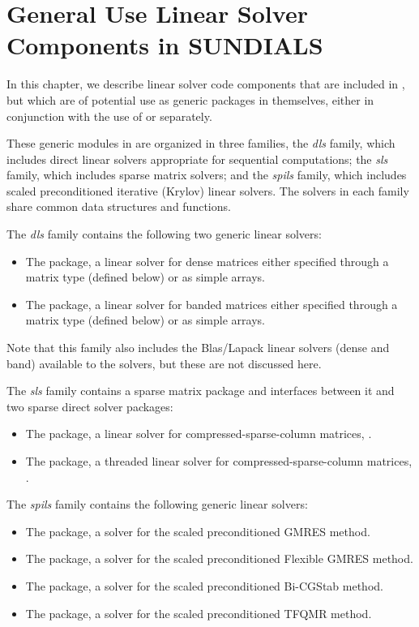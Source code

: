 \chapter{General Use Linear Solver Components in SUNDIALS}\label{s:gen_linsolv}

In this chapter, we describe linear solver code components that are included in
{\sundials}, but which are of potential use as generic packages in themselves,
either in conjunction with the use of {\sundials} or separately.

These generic modules in {\sundials} are organized in
three families, the {\em dls} family, which includes direct
linear solvers appropriate for sequential computations; the {\em sls}
family, which includes sparse matrix solvers; and the {\em spils}
family, which includes scaled preconditioned iterative (Krylov) linear solvers.
The solvers in each family share common data structures and functions.

The {\em dls} family contains the following two generic linear solvers:
\begin{itemize}
\item The {\dense} package, a linear solver for dense matrices either specified 
  through a matrix type (defined below) or as simple arrays.
\item The {\band} package, a linear solver for banded matrices either specified 
  through a matrix type (defined below) or as simple arrays.
\end{itemize}
Note that this family also includes the Blas/Lapack linear solvers (dense and band) 
available to the {\sundials} solvers, but these are not discussed here.

The {\em sls} family contains a sparse matrix package and interfaces between
it and two sparse direct solver packages:
\begin{itemize}
\item The {\klu} package, a linear solver for compressed-sparse-column
  matrices, \cite{KLU_site,DaPa:10}.
\item The {\superlumt} package, a threaded linear solver for
  compressed-sparse-column matrices, \cite{SuperLUMT_site,Li:05,DGL:99}.
\end{itemize}

The {\em spils} family contains the following generic linear solvers:
\begin{itemize}
\item The {\spgmr} package, a solver for the scaled preconditioned GMRES method.
\item The {\spfgmr} package, a solver for the scaled preconditioned Flexible GMRES method.
\item The {\spbcg} package, a solver for the scaled preconditioned Bi-CGStab method.
\item The {\sptfqmr} package, a solver for the scaled preconditioned TFQMR method.
\end{itemize}

